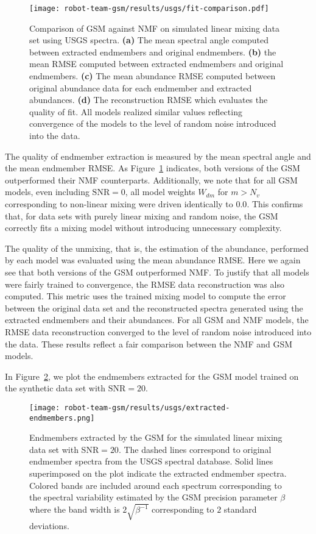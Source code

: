 \begin{figure}[H]
  \centering
  \texttt{[image: robot-team-gsm/results/usgs/fit-comparison.pdf]}
  \caption{Comparison of GSM against NMF on simulated linear mixing data set
    using USGS spectra. \textbf{(a)} The mean spectral angle computed between
    extracted endmembers and original endmembers. \textbf{(b)} the mean RMSE
    computed between extracted endmembers and original endmembers. \textbf{(c)}
    The mean abundance RMSE computed between original abundance data for each
    endmember and extracted abundances. \textbf{(d)} The reconstruction RMSE
    which evaluates the quality of fit. All models realized similar values
    reflecting convergence of the models to the level of random noise introduced
    into the data.}
  \label{fig:usgs-fits}
\end{figure}

The quality of endmember extraction is measured by the mean spectral angle and
the mean endmember RMSE. As Figure~\ref{fig:usgs-fits} indicates, both versions
of the GSM outperformed their NMF counterparts. Additionally, we note that for
all GSM models, even including $\text{SNR}=0$, all model weights $W_{dm}$ for
$m>N_v$ corresponding to non-linear mixing were driven identically to $0.0$.
This confirms that, for data sets with purely linear mixing and random noise,
the GSM correctly fits a mixing model without introducing unnecessary
complexity.

The quality of the unmixing, that is, the estimation of the abundance, performed
by each model was evaluated using the mean abundance RMSE. Here we again see
that both versions of the GSM outperformed NMF. To justify that all models were
fairly trained to convergence, the RMSE data reconstruction was also computed.
This metric uses the trained mixing model to compute the error between the
original data set and the reconstructed spectra generated using the extracted
endmembers and their abundances. For all GSM and NMF models, the RMSE data
reconstruction converged to the level of random noise introduced into the data.
These results reflect a fair comparison between the NMF and GSM models.

In Figure~\ref{fig:usgs-endmembers}, we plot the endmembers extracted for the
GSM model trained on the synthetic data set with $\text{SNR}=20$.

\begin{figure}[H]
  \centering
  \texttt{[image: robot-team-gsm/results/usgs/extracted-endmembers.png]}
  \caption{Endmembers extracted by the GSM for the simulated linear mixing data
    set with SNR$=20$. The dashed lines correspond to original endmember spectra
    from the USGS spectral database. Solid lines superimposed on the plot
    indicate the extracted endmember spectra. Colored bands are included around
    each spectrum corresponding to the spectral variability estimated by the GSM
    precision parameter $\beta$ where the band width is $2\sqrt{\beta^{-1}}$
    corresponding to $2$ standard deviations.}
  \label{fig:usgs-endmembers}
\end{figure}

